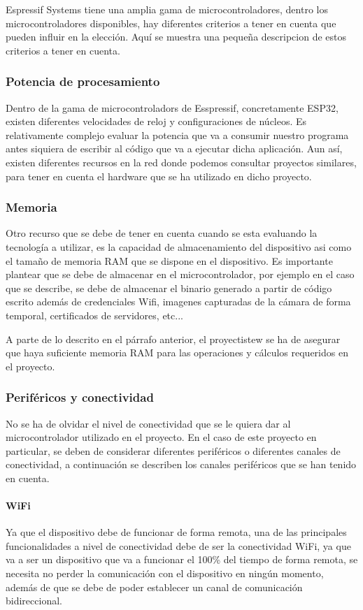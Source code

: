 Espressif Systems tiene una amplia gama de microcontroladores, dentro los microcontroladores disponibles, hay diferentes criterios a tener en cuenta que pueden influir en la elección. Aquí se muestra una pequeña descripcion de estos criterios a tener en cuenta.

\subsubsection{Potencia de procesamiento}
Dentro de la gama de microcontroladors de Esspressif, concretamente ESP32, existen diferentes velocidades de reloj y configuraciones de núcleos. Es relativamente complejo evaluar la potencia que va a consumir nuestro programa antes siquiera de escribir al código que va a ejecutar dicha aplicación. Aun así, existen diferentes recursos en la red donde podemos consultar proyectos similares, para tener en cuenta el hardware que se ha utilizado en dicho proyecto.

\subsubsection{Memoria}
Otro recurso que se debe de tener en cuenta cuando se esta evaluando la tecnología a utilizar, es la capacidad de almacenamiento del dispositivo asi como el tamaño de memoria RAM que se dispone en el dispositivo. Es importante plantear que se debe de almacenar en el microcontrolador, por ejemplo en el caso que se describe, se debe de almacenar el binario generado a partir de código escrito además de credenciales Wifi, imagenes capturadas de la cámara de forma temporal, certificados de servidores, etc...

A parte de lo descrito en el párrafo anterior, el proyectistew se ha de asegurar que haya suficiente memoria RAM para las operaciones y cálculos requeridos en el proyecto.

\subsubsection{Periféricos y conectividad}
No se ha de olvidar el nivel de conectividad que se le quiera dar al microcontrolador utilizado en el proyecto. En el caso de este proyecto en particular, se deben de considerar diferentes periféricos o diferentes canales de conectividad, a continuación se describen los canales  periféricos que se han tenido en cuenta.  

\paragraph{WiFi}
Ya que el dispositivo debe de funcionar de forma remota, una de las principales funcionalidades a nivel de conectividad debe de ser la conectividad WiFi, ya que va a ser un dispositivo que va a funcionar el 100\% del tiempo de forma remota, se necesita no perder la comunicación con el dispositivo en ningún momento, además de que se debe de poder establecer un canal de comunicación bidireccional.

